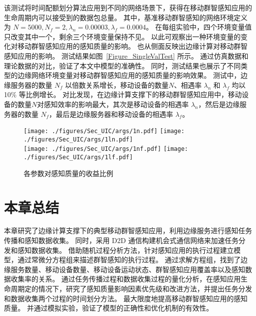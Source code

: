 该测试将时间配额划分算法应用到不同的网络场景下，获得在移动群智感知应用的生命周期内可以接受到的数据包总量。
其中，基准移动群智感知的网络环境定义为 $N=5000, N_f=2, \lambda_n = 0.00003, \lambda_f=0.0004$。
在每组实验中，四个环境变量值只改变其中一个，剩余三个环境变量保持不见。
以此可观察出一种环境变量的变化对移动群智感知应用的感知质量的影响。
也从侧面反映出边缘计算对移动群智感知应用的影响。
测试结果如图~\ref{Figure_SingleValTest} 所示。
通过仿真数据和理论数据的对比，验证了本文中模型的准确性。
同时，测试结果也展示了不同类型的边缘网络环境变量对移动群智感知应用的感知质量的影响效果。
测试中，边缘服务器的数量 $N_f$ 以倍数关系增长，移动设备的数量$N$、相遇率 $\lambda_n$ 和 $\lambda_f$ 均以 10\% 等比例增长。
对比发现，在边缘计算支撑下的移动群智感知应用中，移动设备的数量$N$对感知效率的影响最大，其次是移动设备的相遇率 $\lambda_n$，然后是边缘服务器的数量 $N_f$，最后是边缘服务器和移动设备的相遇率 $\lambda_f$。

\begin{figure}[!h]
  \centering
	{\texttt{[image: ./figures/Sec\_UIC/args/1n.pdf]}}
	{\texttt{[image: ./figures/Sec\_UIC/args/1ln.pdf]}}\\
	{\texttt{[image: ./figures/Sec\_UIC/args/1nf.pdf]}}
	{\texttt{[image: ./figures/Sec\_UIC/args/1lf.pdf]}}
	\vspace{-1em}
	\caption{各参数对感知质量的收益比例}
	\label{Figure_SingleVal}
\end{figure}


\section{本章总结}

本章研究了边缘计算支撑下的典型移动群智感知应用，利用边缘服务进行感知任务传播和感知数据收集。
同时，采用 D2D 通信构建机会式通信网络来加速任务分发和感知数据收集。
借助随机过程分析方法，针对感知应用的执行过程建立模型，通过常微分方程组来描述群智感知的执行过程。
通过求解方程组，找到了边缘服务数量、移动设备数量、移动设备运动状态、群智感知应用覆盖率以及感知数据收集率的关系。
通过任务传播过程和数据收集过程的量化分析，在感知应用生命周期定的情况下，研究了感知质量影响因素优先级和改进方法，并提出任务分发和数据收集两个过程的时间划分方法。
最大限度地提高移动群智感知应用的感知质量。
并通过模拟实验，验证了模型的正确性和优化机制的有效性。
